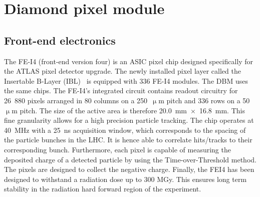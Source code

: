 \documentclass[12pt]{packages/mytustyle}  %
\begin{document}
\section{Diamond pixel module}
\label{sec:atlasdbm}
\subsection{Front-end electronics}
The FE-I4 (front-end version four) is an ASIC pixel chip designed specifically for the ATLAS pixel detector upgrade. The newly installed pixel layer called the Insertable B-Layer (IBL)~\cite{} is equipped with 336 FE-I4 modules. The DBM uses the same chips. The FE-I4's integrated circuit contains readout circuitry for 26~880 pixels arranged in 80 columns on a 250~$\upmu$m pitch and 336 rows on a 50~$\upmu$m pitch. The size of the active area is therefore 20.0~mm~$\times$~16.8~mm. This fine granularity allows for a high precision particle tracking. The chip operates at 40~MHz with a 25~ns acquisition window, which corresponds to the spacing of the particle bunches in the LHC. It is hence able to correlate hits/tracks to their corresponding bunch. Furthermore, each pixel is capable of measuring the deposited charge of a detected particle by using the Time-over-Threshold method. The pixels are designed to collect the negative charge. Finally, the FEI4 has been designed to withstand a radiation dose up to 300 MGy. This ensures long term stability in the radiation hard forward region of the experiment.
\end{document}
